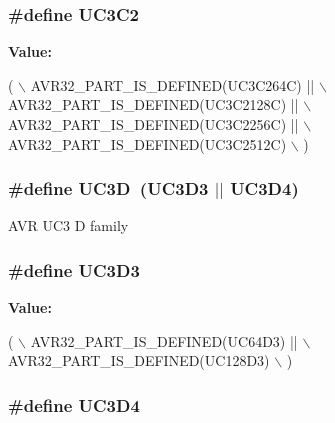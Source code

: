 \hypertarget{group__uc3__part__macros__group_ga74bddd178c8022709acca0ad80ff4db8}{
\subsubsection[{U\-C3\-C2}]{\setlength{\rightskip}{0pt plus 5cm}\#define U\-C3\-C2}}\label{group__uc3__part__macros__group_ga74bddd178c8022709acca0ad80ff4db8}
{\bfseries Value\-:}
\begin{DoxyCode}
(       \(\backslash\)
                AVR32\_PART\_IS\_DEFINED(UC3C264C)  || \(\backslash\)
                AVR32\_PART\_IS\_DEFINED(UC3C2128C) || \(\backslash\)
                AVR32\_PART\_IS\_DEFINED(UC3C2256C) || \(\backslash\)
                AVR32\_PART\_IS\_DEFINED(UC3C2512C) \(\backslash\)
                )
\end{DoxyCode}
\hypertarget{group__uc3__part__macros__group_ga351a876f40669641e6ba9620909143d3}{
\subsubsection[{U\-C3\-D}]{\setlength{\rightskip}{0pt plus 5cm}\#define U\-C3\-D~(U\-C3\-D3 $|$$|$ U\-C3\-D4)}}\label{group__uc3__part__macros__group_ga351a876f40669641e6ba9620909143d3}
A\-V\-R U\-C3 D family \hypertarget{group__uc3__part__macros__group_ga432af70c4d53fc917770e4ce48440613}{
\subsubsection[{U\-C3\-D3}]{\setlength{\rightskip}{0pt plus 5cm}\#define U\-C3\-D3}}\label{group__uc3__part__macros__group_ga432af70c4d53fc917770e4ce48440613}
{\bfseries Value\-:}
\begin{DoxyCode}
(       \(\backslash\)
                AVR32\_PART\_IS\_DEFINED(UC64D3)  || \(\backslash\)
                AVR32\_PART\_IS\_DEFINED(UC128D3) \(\backslash\)
                )
\end{DoxyCode}
\hypertarget{group__uc3__part__macros__group_gae271cf5f4b9459baea7216c071e02d76}{
\subsubsection[{U\-C3\-D4}]{\setlength{\rightskip}{0pt plus 5cm}\#define U\-C3\-D4}}\label{group__uc3__part__macros__group_gae271cf5f4b9459baea7216c071e02d76}
